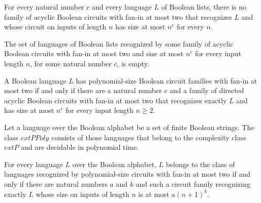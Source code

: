 \begin{theorem}
\label{Language.not_inSIZE_pow}
\leanok
{}
For every natural number $c$ and every language $L$ of Boolean lists, there is no family
of acyclic Boolean circuits with fan-in at most two that recognizes $L$ and whose
circuit on inputs of length $n$ has size at most $n^c$ for every $n$.
\end{theorem}

\begin{theorem}
\label{Language.setOf_inSIZE_pow_eq_empty}
\leanok
{}
The set of languages of Boolean lists recognized by some family of acyclic Boolean
circuits with fan-in at most two and size at most $n^c$ for every input length $n$, for
some natural number $c$, is empty.
\end{theorem}

\begin{theorem}
\label{Language.inPPoly_iff_eventually}
\leanok
{}
A Boolean language $L$ has polynomial-size Boolean circuit families with fan-in at most
two if and only if there are a natural number $c$ and a family of directed acyclic
Boolean circuits with fan-in at most two that recognizes exactly $L$ and has size at
most $n^c$ for every input length $n\ge 2$.
\end{theorem}

\begin{definition}
\label{BoolCircuit.PPoly}
\leanok
{}
Let a language over the Boolean alphabet be a set of finite Boolean strings. The class
$	ext{PPoly}$ consists of those languages that belong to the complexity class $	ext{P}$
and are decidable in polynomial time.
\end{definition}

\begin{theorem}
\label{BoolCircuit.mem_PPoly_iff}
\leanok
{}
For every language $L$ over the Boolean alphabet, $L$ belongs to the class of languages
recognized by polynomial-size circuits with fan-in at most two if and only if there are
natural numbers $a$ and $k$ and such a circuit family recognizing exactly $L$ whose size
on inputs of length $n$ is at most $a(n+1)^k$.
\end{theorem}
